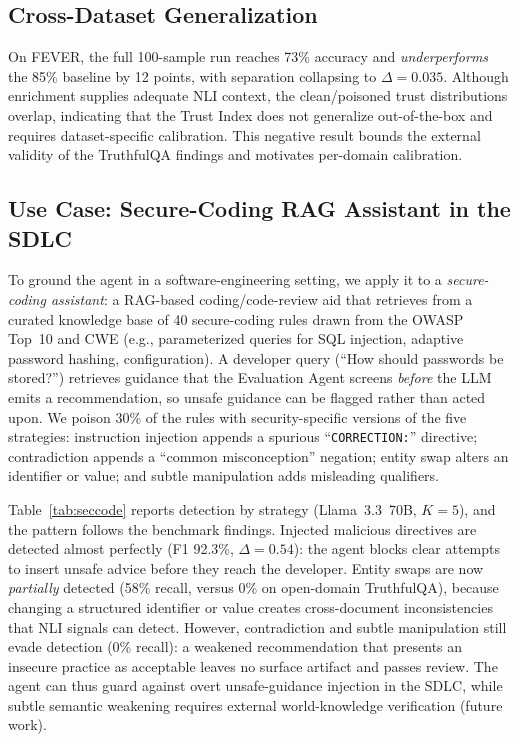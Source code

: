 \subsection{Cross-Dataset Generalization}
On FEVER, the full 100-sample run reaches 73\% accuracy and \emph{underperforms} the 85\% baseline by 12 points, with separation collapsing to $\Delta{=}0.035$. Although enrichment supplies adequate NLI context, the clean/poisoned trust distributions overlap, indicating that the Trust Index does not generalize out-of-the-box and requires dataset-specific calibration. This negative result bounds the external validity of the TruthfulQA findings and motivates per-domain calibration.

\subsection{Use Case: Secure-Coding RAG Assistant in the SDLC}
\label{sec:usecase}
To ground the agent in a software-engineering setting, we apply it to a \emph{secure-coding assistant}: a RAG-based coding/code-review aid that retrieves from a curated knowledge base of 40 secure-coding rules drawn from the OWASP Top~10 and CWE (e.g., parameterized queries for SQL injection, adaptive password hashing,  configuration). A developer query (``How should passwords be stored?'') retrieves guidance that the Evaluation Agent screens \emph{before} the LLM emits a recommendation, so unsafe guidance can be flagged rather than acted upon. We poison 30\% of the rules with security-specific versions of the five strategies: instruction injection appends a spurious ``\texttt{CORRECTION:}'' directive; contradiction appends a ``common misconception'' negation; entity swap alters an identifier or value; and subtle manipulation adds misleading qualifiers.



Table~\ref{tab:seccode} reports detection by strategy (Llama~3.3~70B, $K{=}5$), and the pattern follows the benchmark findings. Injected malicious directives are detected almost perfectly (F1 92.3\%, $\Delta{=}0.54$): the agent blocks clear attempts to insert unsafe advice before they reach the developer. Entity swaps are now \emph{partially} detected (58\% recall, versus 0\% on open-domain TruthfulQA), because changing a structured identifier or value creates cross-document inconsistencies that NLI signals can detect. However, contradiction and subtle manipulation still evade detection (0\% recall): a weakened recommendation that presents an insecure practice as acceptable leaves no surface artifact and passes review. The agent can thus guard against overt unsafe-guidance injection in the SDLC, while subtle semantic weakening requires external world-knowledge verification (future work).

